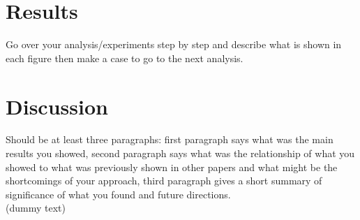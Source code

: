 \documentclass[9pt,twocolumn]{paper-template}
\begin{document}
\section*{Results}
Go over your analysis/experiments step by step and
describe what is shown in each figure then make a case
to go to the next analysis.\\


\section*{Discussion}
Should be at least three paragraphs: first paragraph says what
was the main results you showed, second paragraph says
what was the relationship of what you showed to what
was previously shown in other papers and what might
be the shortcomings of your approach, third paragraph
gives a short summary of significance of what you found
and future directions.\\

(dummy text)\lipsum[1]
\end{document}
